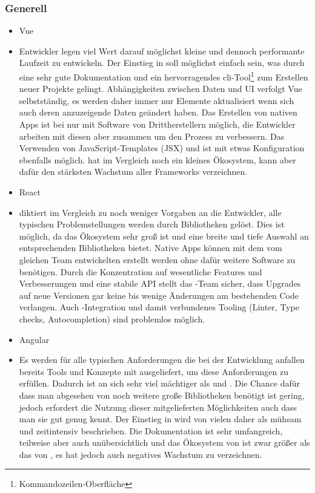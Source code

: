 \subsubsection{Generell}
\begin{itemize}
    \item{Vue}
    \item[] Entwickler legen viel Wert darauf möglichst kleine und dennoch performante Laufzeit zu entwickeln. Der Einstieg in  soll möglichst einfach sein, was durch eine sehr gute Dokumentation und ein hervorragendes \gls{cli}-Tool\footnote{Kommandozeilen-Oberfläche} zum Erstellen neuer Projekte gelingt. Abhängigkeiten zwischen Daten und UI verfolgt Vue selbstständig, es werden daher immer nur Elemente aktualisiert wenn sich auch deren anzuzeigende Daten geändert haben. Das Erstellen von nativen Apps ist bei  nur mit Software von Drittherstellern möglich, die Entwickler arbeiten mit diesen aber zusammen um den Prozess zu verbessern. Das Verwenden von JavaScript-Templates (JSX) und  ist mit etwas Konfiguration ebenfalls möglich.  hat im Vergleich noch ein kleines Ökosystem, kann aber dafür den stärksten Wachstum aller Frameworks verzeichnen.
    \item{React}
    \item[]  diktiert im Vergleich zu  noch weniger Vorgaben an die Entwickler, alle typischen Problemstellungen werden durch Bibliotheken gelöst. Dies ist möglich, da das Ökosystem sehr groß ist und eine breite und tiefe Auswahl an entsprechenden Bibliotheken bietet. Native Apps können mit dem vom gleichen Team entwickelten  erstellt werden ohne dafür weitere Software zu benötigen. Durch die Konzentration auf wesentliche Features und Verbesserungen und eine stabile API stellt das -Team sicher, dass Upgrades auf neue Versionen gar keine bis wenige Änderungen am bestehenden Code verlangen. Auch -Integration und damit verbundenes Tooling (Linter, Type checks, Autocompletion) sind problemlos möglich.
    \item{Angular}
    \item[] Es werden für alle typischen Anforderungen die bei der Entwicklung anfallen bereits Tools und Konzepte mit ausgeliefert, um diese Anforderungen zu erfüllen. Dadurch ist  an sich sehr viel mächtiger als  und . Die Chance dafür dass man abgesehen von  noch weitere große Bibliotheken benötigt ist gering, jedoch erfordert die Nutzung dieser mitgelieferten Möglichkeiten auch dass man sie gut genug kennt. Der Einstieg in  wird von vielen daher als mühsam und zeitintensiv beschrieben. Die Dokumentation ist sehr umfangreich, teilweise aber auch unübersichtlich und das Ökosystem von  ist zwar größer als das von , es hat jedoch auch negatives Wachstum zu verzeichnen.
\end{itemize}

